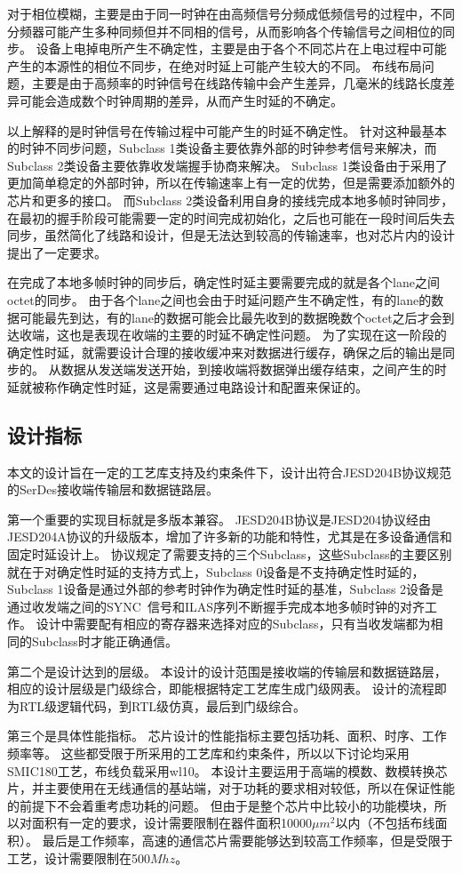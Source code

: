\documentclass[UTF8]{ctexart}
\begin{document}
对于相位模糊，主要是由于同一时钟在由高频信号分频成低频信号的过程中，不同分频器可能产生多种同频但并不同相的信号，从而影响各个传输信号之间相位的同步。
设备上电掉电所产生不确定性，主要是由于各个不同芯片在上电过程中可能产生的本源性的相位不同步，在绝对时延上可能产生较大的不同。
布线布局问题，主要是由于高频率的时钟信号在线路传输中会产生差异，几毫米的线路长度差异可能会造成数个时钟周期的差异，从而产生时延的不确定。

以上解释的是时钟信号在传输过程中可能产生的时延不确定性。
针对这种最基本的时钟不同步问题，Subclass 1类设备主要依靠外部的时钟参考信号来解决，而Subclass 2类设备主要依靠收发端握手协商来解决。
Subclass 1类设备由于采用了更加简单稳定的外部时钟，所以在传输速率上有一定的优势，但是需要添加额外的芯片和更多的接口。
而Subclass 2类设备利用自身的接线完成本地多帧时钟同步，在最初的握手阶段可能需要一定的时间完成初始化，之后也可能在一段时间后失去同步，虽然简化了线路和设计，但是无法达到较高的传输速率，也对芯片内的设计提出了一定要求。

在完成了本地多帧时钟的同步后，确定性时延主要需要完成的就是各个lane之间octet的同步。
由于各个lane之间也会由于时延问题产生不确定性，有的lane的数据可能最先到达，有的lane的数据可能会比最先收到的数据晚数个octet之后才会到达收端，这也是表现在收端的主要的时延不确定性问题。
为了实现在这一阶段的确定性时延，就需要设计合理的接收缓冲来对数据进行缓存，确保之后的输出是同步的。
从数据从发送端发送开始，到接收端将数据弹出缓存结束，之间产生的时延就被称作确定性时延，这是需要通过电路设计和配置来保证的。

\subsection{设计指标}

本文的设计旨在一定的工艺库支持及约束条件下，设计出符合JESD204B协议规范的SerDes接收端传输层和数据链路层。

第一个重要的实现目标就是多版本兼容。
JESD204B协议是JESD204协议经由JESD204A协议的升级版本，增加了许多新的功能和特性，尤其是在多设备通信和固定时延设计上。
协议规定了需要支持的三个Subclass，这些Subclass的主要区别就在于对确定性时延的支持方式上，Subclass 0设备是不支持确定性时延的，Subclass 1设备是通过外部的参考时钟作为确定性时延的基准，Subclass 2设备是通过收发端之间的SYNC~信号和ILAS序列不断握手完成本地多帧时钟的对齐工作。
设计中需要配有相应的寄存器来选择对应的Subclass，只有当收发端都为相同的Subclass时才能正确通信。

第二个是设计达到的层级。
本设计的设计范围是接收端的传输层和数据链路层，相应的设计层级是门级综合，即能根据特定工艺库生成门级网表。
设计的流程即为RTL级逻辑代码，到RTL级仿真，最后到门级综合。

第三个是具体性能指标。
芯片设计的性能指标主要包括功耗、面积、时序、工作频率等。
这些都受限于所采用的工艺库和约束条件，所以以下讨论均采用SMIC180工艺，布线负载采用wl10。
本设计主要运用于高端的模数、数模转换芯片，并主要使用在无线通信的基站端，对于功耗的要求相对较低，所以在保证性能的前提下不会着重考虑功耗的问题。
但由于是整个芯片中比较小的功能模块，所以对面积有一定的要求，设计需要限制在器件面积10000$\mu m^2$以内（不包括布线面积）。
最后是工作频率，高速的通信芯片需要能够达到较高工作频率，但是受限于工艺，设计需要限制在500$Mhz$。


\end{document}
